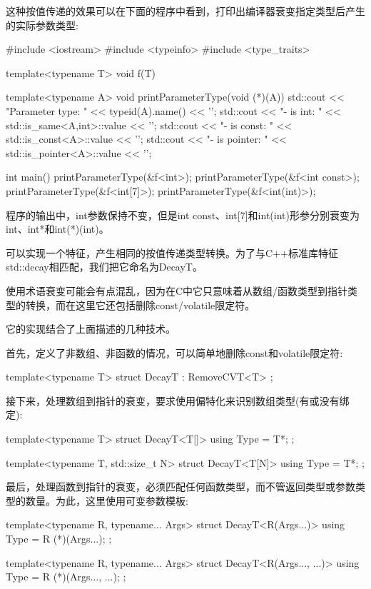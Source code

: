 这种按值传递的效果可以在下面的程序中看到，打印出编译器衰变指定类型后产生的实际参数类型:

\begin{cpp}
#include <iostream>
#include <typeinfo>
#include <type_traits>

template<typename T>
void f(T)
{ }

template<typename A>
void printParameterType(void (*)(A))
{
	std::cout << "Parameter type: " << typeid(A).name() << '\n';
	std::cout << "- is int: " << std::is_same<A,int>::value << '\n';
	std::cout << "- is const: " << std::is_const<A>::value << '\n';
	std::cout << "- is pointer: " << std::is_pointer<A>::value << '\n';
}

int main()
{
	printParameterType(&f<int>);
	printParameterType(&f<int const>);
	printParameterType(&f<int[7]>);
	printParameterType(&f<int(int)>);
}
\end{cpp}

程序的输出中，int参数保持不变，但是int const、int[7]和int(int)形参分别衰变为int、int*和int(*)(int)。

可以实现一个特征，产生相同的按值传递类型转换。为了与C++标准库特征std::decay相匹配，我们把它命名为DecayT。

\begin{notice}
使用术语衰变可能会有点混乱，因为在C中它只意味着从数组/函数类型到指针类型的转换，而在这里它还包括删除const/volatile限定符。
\end{notice}

它的实现结合了上面描述的几种技术。

首先，定义了非数组、非函数的情况，可以简单地删除const和volatile限定符:

\begin{cpp}
template<typename T>
struct DecayT : RemoveCVT<T> {
};
\end{cpp}

接下来，处理数组到指针的衰变，要求使用偏特化来识别数组类型(有或没有绑定):

\begin{cpp}
template<typename T>
struct DecayT<T[]> {
	using Type = T*;
};

template<typename T, std::size_t N>
struct DecayT<T[N]> {
	using Type = T*;
};
\end{cpp}

最后，处理函数到指针的衰变，必须匹配任何函数类型，而不管返回类型或参数类型的数量。为此，这里使用可变参数模板:

\begin{cpp}
template<typename R, typename... Args>
struct DecayT<R(Args...)> {
	using Type = R (*)(Args...);
};

template<typename R, typename... Args>
struct DecayT<R(Args..., ...)> {
	using Type = R (*)(Args..., ...);
};
\end{cpp}

